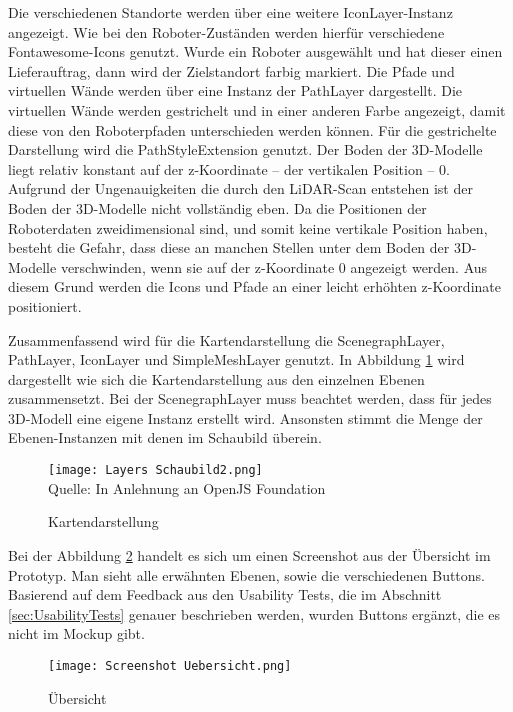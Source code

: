 Die verschiedenen Standorte werden über eine weitere IconLayer-Instanz angezeigt. Wie bei den Roboter-Zuständen werden hierfür verschiedene Fontawesome-Icons genutzt. Wurde ein Roboter ausgewählt und hat dieser einen Lieferauftrag, dann wird der Zielstandort farbig markiert. Die Pfade und virtuellen Wände werden über eine Instanz der PathLayer \cite{DeckglPathLayer} dargestellt. Die virtuellen Wände werden gestrichelt und in einer anderen Farbe angezeigt, damit diese von den Roboterpfaden unterschieden werden können. Für die gestrichelte Darstellung wird die PathStyleExtension \cite{DeckglPathStyleExtension} genutzt. Der Boden der 3D-Modelle liegt relativ konstant auf der z-Koordinate – der vertikalen Position – 0. Aufgrund der Ungenauigkeiten die durch den \ac{LiDAR}-Scan entstehen ist der Boden der 3D-Modelle nicht vollständig eben. Da die Positionen der Roboterdaten zweidimensional sind, und somit keine vertikale Position haben, besteht die Gefahr, dass diese an manchen Stellen unter dem Boden der 3D-Modelle verschwinden, wenn sie auf der z-Koordinate 0 angezeigt werden. Aus diesem Grund werden die Icons und Pfade an einer leicht erhöhten z-Koordinate positioniert.

Zusammenfassend wird für die Kartendarstellung die ScenegraphLayer, PathLayer, IconLayer und SimpleMeshLayer genutzt. In Abbildung \ref{fig:MapSchematic} wird dargestellt wie sich die Kartendarstellung aus den einzelnen Ebenen zusammensetzt. Bei der ScenegraphLayer muss beachtet werden, dass für jedes 3D-Modell eine eigene Instanz erstellt wird. Ansonsten stimmt die Menge der Ebenen-Instanzen mit denen im Schaubild überein.

\begin{figure}[H]
    \caption{Kartendarstellung}\label{fig:MapSchematic}
    \texttt{[image: Layers Schaubild2.png]}
    \\
    Quelle: In Anlehnung an OpenJS Foundation \cite{DeckglBaseMaps}
\end{figure}

Bei der Abbildung \ref{fig:OverviewScreenshot} handelt es sich um einen Screenshot aus der Übersicht im Prototyp. Man sieht alle erwähnten Ebenen, sowie die verschiedenen Buttons. Basierend auf dem Feedback aus den Usability Tests, die im Abschnitt \ref{sec:UsabilityTests} genauer beschrieben werden, wurden Buttons ergänzt, die es nicht im \gls{Mockup} gibt.

\begin{figure}[H]
    \caption{Übersicht}\label{fig:OverviewScreenshot}
    \texttt{[image: Screenshot Uebersicht.png]}
\end{figure}

